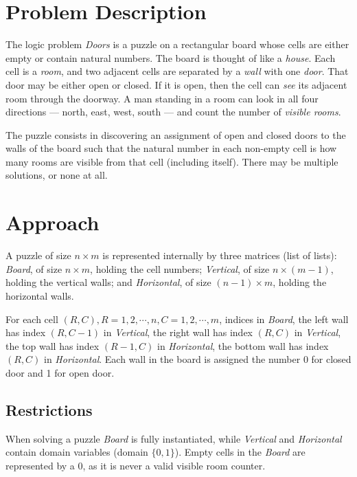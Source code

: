 \documentclass[runningheads]{llncs}
\begin{document}
\section{Problem Description}
\label{sec:description}

The logic problem \textit{Doors} is a puzzle on a rectangular board whose cells are either empty or contain natural numbers. The board is thought of like a \textit{house}. Each cell is a \textit{room}, and two adjacent cells are separated by a \textit{wall} with one \textit{door}. That door may be either open or closed. If it is open, then the cell can \textsl{see} its adjacent room through the doorway. A man standing in a room can look in all four directions --- north, east, west, south --- and count the number of \textit{visible rooms}.

The puzzle consists in discovering an assignment of open and closed doors to the walls of the board such that the natural number in each non-empty cell is how many rooms are visible from that cell (including itself). There may be multiple solutions, or none at all.

\section{Approach}
\label{sec:approach}

A puzzle of size $n\times m$ is represented internally by three matrices (list of lists): \textsl{Board}, of size $n\times m$, holding the cell numbers; \textsl{Vertical}, of size $n\times (m-1)$, holding the vertical walls; and \textsl{Horizontal}, of size $(n-1)\times m$, holding the horizontal walls.

For each cell $(R,C), R=1,2,\cdots,n, C=1,2,\cdots,m$, indices in \textsl{Board}, the left wall has index $(R,C-1)$ in \textsl{Vertical}, the right wall has index $(R,C)$ in \textsl{Vertical}, the top wall has index $(R-1,C)$ in \textsl{Horizontal}, the bottom wall has index $(R,C)$ in \textsl{Horizontal}.
Each wall in the board is assigned the number 0 for closed door and 1 for open door.

\subsection{Restrictions}
\label{subsec:solutionrestrictions}

When solving a puzzle \textsl{Board} is fully instantiated, while \textsl{Vertical} and \textsl{Horizontal} contain domain variables (domain $\{0,1\}$). Empty cells in the \textsl{Board} are represented by a $0$, as it is never a valid visible room counter.
\end{document}

